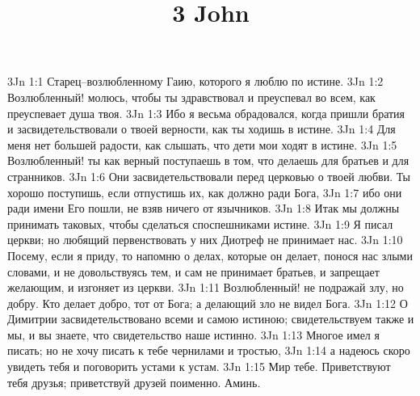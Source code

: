 

\title{3 John}

3Jn 1:1  Старец--возлюбленному Гаию, которого я люблю по истине.
3Jn 1:2  Возлюбленный! молюсь, чтобы ты здравствовал и преуспевал во всем, как преуспевает душа твоя.
3Jn 1:3  Ибо я весьма обрадовался, когда пришли братия и засвидетельствовали о твоей верности, как ты ходишь в истине.
3Jn 1:4  Для меня нет большей радости, как слышать, что дети мои ходят в истине.
3Jn 1:5  Возлюбленный! ты как верный поступаешь в том, что делаешь для братьев и для странников.
3Jn 1:6  Они засвидетельствовали перед церковью о твоей любви. Ты хорошо поступишь, если отпустишь их, как должно ради Бога,
3Jn 1:7  ибо они ради имени Его пошли, не взяв ничего от язычников.
3Jn 1:8  Итак мы должны принимать таковых, чтобы сделаться споспешниками истине.
3Jn 1:9  Я писал церкви; но любящий первенствовать у них Диотреф не принимает нас.
3Jn 1:10  Посему, если я приду, то напомню о делах, которые он делает, понося нас злыми словами, и не довольствуясь тем, и сам не принимает братьев, и запрещает желающим, и изгоняет из церкви.
3Jn 1:11  Возлюбленный! не подражай злу, но добру. Кто делает добро, тот от Бога; а делающий зло не видел Бога.
3Jn 1:12  О Димитрии засвидетельствовано всеми и самою истиною; свидетельствуем также и мы, и вы знаете, что свидетельство наше истинно.
3Jn 1:13  Многое имел я писать; но не хочу писать к тебе чернилами и тростью,
3Jn 1:14  а надеюсь скоро увидеть тебя и поговорить устами к устам.
3Jn 1:15  Мир тебе. Приветствуют тебя друзья; приветствуй друзей поименно. Аминь.


